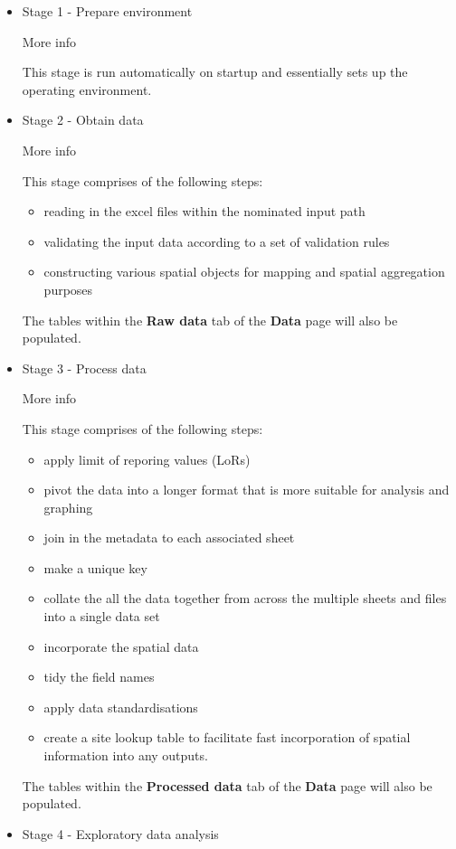 \documentclass[
  8pt,
  a4paper]{article}
\providecommand{\tightlist}{%
  \setlength{\itemsep}{0pt}\setlength{\parskip}{0pt}}\usepackage{longtable,booktabs,array}
\begin{document}
\begin{itemize}
\item
  Stage 1 - Prepare environment

  More info

  This stage is run automatically on startup and essentially sets up the
  operating environment.
\item
  Stage 2 - Obtain data

  More info

  This stage comprises of the following steps:

  \begin{itemize}
  \tightlist
  \item
    reading in the excel files within the nominated input path
  \item
    validating the input data according to a set of validation rules
  \item
    constructing various spatial objects for mapping and spatial
    aggregation purposes
  \end{itemize}

  The tables within the \textbf{Raw data} tab of the \textbf{Data} page
  will also be populated.
\item
  Stage 3 - Process data

  More info

  This stage comprises of the following steps:

  \begin{itemize}
  \tightlist
  \item
    apply limit of reporing values (LoRs)
  \item
    pivot the data into a longer format that is more suitable for
    analysis and graphing
  \item
    join in the metadata to each associated sheet
  \item
    make a unique key
  \item
    collate the all the data together from across the multiple sheets
    and files into a single data set
  \item
    incorporate the spatial data
  \item
    tidy the field names
  \item
    apply data standardisations
  \item
    create a site lookup table to facilitate fast incorporation of
    spatial information into any outputs.
  \end{itemize}

  The tables within the \textbf{Processed data} tab of the \textbf{Data}
  page will also be populated.
\item
  Stage 4 - Exploratory data analysis


\end{itemize}
\end{document}
